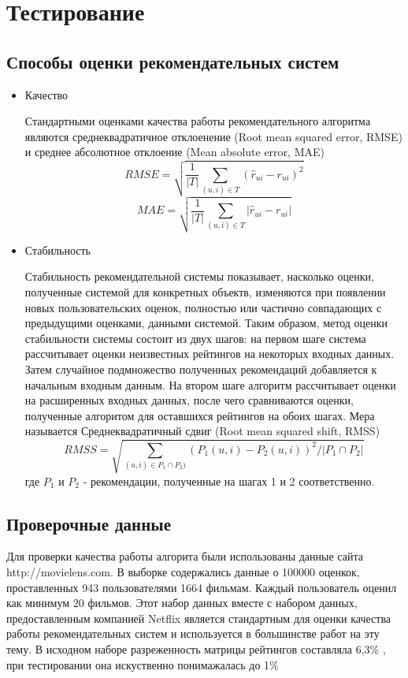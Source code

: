 \documentclass[12pt]{article} %
\begin{document}
\section{Тестирование}
\subsection{Способы оценки рекомендательных систем}
\begin{itemize}
\item  Качество 
\par Стандартными оценками качества работы рекомендательного алгоритма являются среднеквадратичное отклоенение (Root mean squared error, RMSE) и среднее абсолютное отклоение (Mean absolute error, MAE)
\[
	RMSE=\sqrt{\frac{1}{|T|}\sum_{(u,i)\in T} (\hat{r}_{ui} - r_{ui})^2}
\]
\[	
	MAE=\sqrt{\frac{1}{|T|}\sum_{(u,i)\in T} |\hat{r}_{ui} - r_{ui}|}
\]
\item Стабильность
\par Стабильность рекомендательной системы показывает, насколько оценки, полученные системой для конкретных объектв, изменяются при появлении новых пользовательских оценок, полностью или частично совпадающих с предыдущими оценками, данными системой. Таким образом, метод оценки стабильности системы состоит из двух шагов: на первом %
шаге система рассчитывает оценки неизвестных рейтингов на некоторых входных данных. Затем случайное подмножество полученных рекомендаций добавляется к начальным входным данным. На втором шаге алгоритм рассчитывает оценки на расширенных входных данных, после чего сравниваются оценки, полученные алгоритом для оставшихся рейтингов на обоих шагах. Мера называется Среднеквадратичный сдвиг (Root mean squared shift, RMSS)
\[
	RMSS=\sqrt{\sum_{(u,i) \in P_{1} \cap P_{2})} (P_{1}(u,i) - P_{2}(u,i))^2 /  |P_{1} \cap P_{2}|}
\]  
где $P_{1}$ и $P_{2}$ - рекомендации, полученные на шагах 1 и 2 соответственно.
\end{itemize}
\subsection{Проверочные данные}
Для проверки качества работы алгорита были использованы данные сайта http://movielens.com. В выборке содержались данные о 100000 оценкок, проставленных  943 пользователями 
1664 фильмам. Каждый пользователь оценил как минимум 20 фильмов. Этот набор данных вместе с набором данных, предоставленным компанией Netflix является стандартным для оценки качества работы рекомендательных систем и используется в большинстве работ на эту тему.
В исходном наборе разреженность матрицы рейтингов составляла 6,3\% , при тестировании она искуственно понимажалась до 1\%
\end{document}
